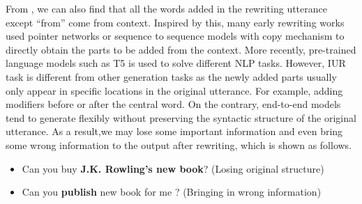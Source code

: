 From , we can also find that all the words added in the rewriting 
utterance except ``from'' come from context. Inspired by this, many early rewriting works used 
pointer networks \citep{NIPS2015_29921001} or sequence to sequence models with copy 
mechanism \citep{gu-etal-2016-incorporating, see-etal-2017-get} to directly obtain the parts to 
be added from the context. More recently, pre-trained language models such as T5 \citep{2020t5} is used to
solve different NLP tasks.
However, IUR task is different from other generation tasks 
as the newly added parts usually
only appear in specific locations in the original utterance.
For example, adding modifiers before or after the central word.
On the contrary, 
end-to-end models
tend to generate
flexibly
without preserving the syntactic structure 
of the original utterance.
As a result,we may lose
some important information
and 
even bring some 
wrong information to the output
after rewriting, which is shown
as follows.

\begin{itemize}
\item Can you buy \textbf{J.K. Rowling's new book}? (Losing original structure)
\item Can you \textbf{publish} new book for me ? (Bringing in wrong information)
\end{itemize}

